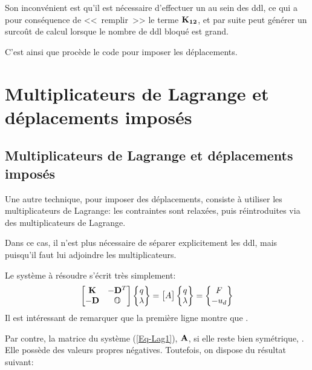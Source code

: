 Son inconvénient est qu'il est nécessaire d'effectuer un  au sein des ddl, ce qui a pour conséquence de 
<<~remplir~>> le terme $\MM{K_{12}}$, et par suite peut générer un surcoût de calcul lorsque le nombre de ddl bloqué
est grand.

C'est ainsi que procède le code \abaqus pour imposer les déplacements.

\medskip
\ifVersionAvecExemplesSepares
   \section{Multiplicateurs de Lagrange et déplacements imposés}\label{Sec-cast}
\else
   \subsection{Multiplicateurs de Lagrange et déplacements imposés}\label{Sec-cast}
\fi

Une autre technique, pour imposer des déplacements, consiste à utiliser les multiplicateurs de Lagrange: les contraintes sont relaxées, puis réintroduites via des multiplicateurs de Lagrange.

Dans ce cas, il n'est plus nécessaire de séparer explicitement les ddl, mais  puisqu'il faut lui adjoindre les multiplicateurs.

Le système à résoudre s'écrit très simplement:
\begin{equation}\label{Eq-Lag1}
\MM*{\MM{K} & -\MM{D}^T\\ -\MM{D} & \mO{}}
\VV*{q\\ \lambda} =
\MM*{A}
\VV*{q\\ \lambda} =
\VV*{F\\ -u_d}
\end{equation}
Il est intéressant de remarquer que la première ligne montre que .

Par contre, la matrice du système (\ref{Eq-Lag1}), $\MM{A}$, si elle reste bien symétrique, . Elle possède des valeurs propres négatives.
\medskipvm
Toutefois, on dispose du résultat suivant:

